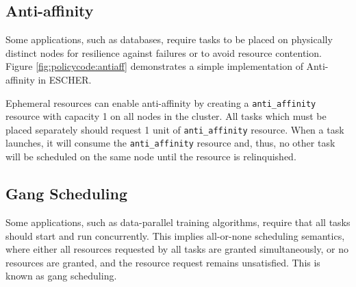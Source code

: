 \subsection{Anti-affinity}
Some applications, such as databases, require tasks to be placed on physically distinct nodes for resilience against failures or to avoid resource contention. Figure \ref{fig:policycode:antiaff} demonstrates a simple implementation of Anti-affinity in ESCHER.  %

Ephemeral resources can enable anti-affinity by creating a \lstinline{anti_affinity} resource with capacity 1 on all nodes in the cluster. All tasks which must be placed separately should request 1 unit of \lstinline{anti_affinity} resource. When a task launches, it will consume the \lstinline{anti_affinity} resource and, thus, no other task will be scheduled on the same node until the resource is relinquished. %




\subsection{Gang Scheduling}
Some applications, such as data-parallel training algorithms, require that all tasks should start and run concurrently. This implies all-or-none scheduling semantics, where either all resources requested by all tasks are granted simultaneously, or no resources are granted, and the resource request remains unsatisfied. This is known as gang scheduling.%


